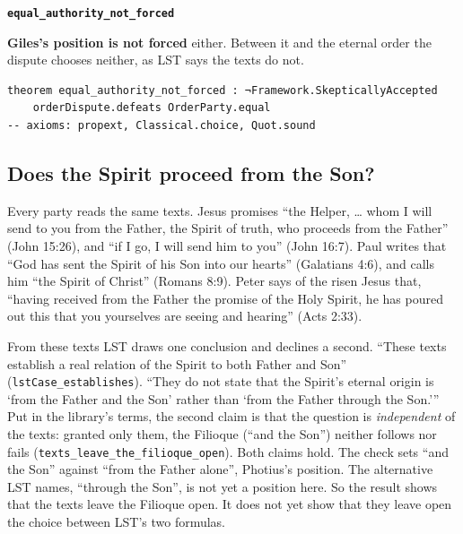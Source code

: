 \documentclass[11pt,paper=\testimonypaper,DIV=13,parskip=false]{scrartcl}
\begin{document}
\par\medskip\noindent\textbf{\texttt{equal\_\allowbreak{}authority\_\allowbreak{}not\_\allowbreak{}forced}}\par\nobreak\noindent
\textbf{Giles’s position is not forced} either. Between it and the eternal order the dispute chooses neither, as LST says the texts do not.

{\small\begin{verbatim}
theorem equal_authority_not_forced : ¬Framework.SkepticallyAccepted
    orderDispute.defeats OrderParty.equal
-- axioms: propext, Classical.choice, Quot.sound
\end{verbatim}}
\subsection*{Does the Spirit proceed from the Son?}
Every party reads the same texts. Jesus promises “the Helper, … whom I will send to you from the Father, the Spirit of truth, who proceeds from the Father” (John 15:26), and “if I go, I will send him to you” (John 16:7). Paul writes that “God has sent the Spirit of his Son into our hearts” (Galatians 4:6), and calls him “the Spirit of Christ” (Romans 8:9). Peter says of the risen Jesus that, “having received from the Father the promise of the Holy Spirit, he has poured out this that you yourselves are seeing and hearing” (Acts 2:33).

From these texts LST draws one conclusion and declines a second. “These texts establish a real relation of the Spirit to both Father and Son” (\texttt{lst\allowbreak{}Case\_\allowbreak{}establishes}). “They do not state that the Spirit’s eternal origin is ‘from the Father and the Son’ rather than ‘from the Father through the Son.’” Put in the library’s terms, the second claim is that the question is \emph{independent} of the texts: granted only them, the Filioque (“and the Son”) neither follows nor fails (\texttt{texts\_\allowbreak{}leave\_\allowbreak{}the\_\allowbreak{}filioque\_\allowbreak{}open}). Both claims hold. The check sets “and the Son” against “from the Father alone”, Photius’s position. The alternative LST names, “through the Son”, is not yet a position here. So the result shows that the texts leave the Filioque open. It does not yet show that they leave open the choice between LST’s two formulas.
\end{document}
